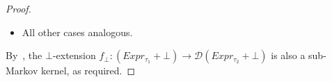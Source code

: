 \begin{proof}
\begin{itemize}
		\medskip
		Then:
		\begin{align*}
			R_s &= \{\vec{r} \in A_{s;\tau_1} \mid \letkw\; y = s[\vec{r}]\; \inkw\; e_2 \in A\} \\
			&= \{\vec{r} \in A_{s;\tau_1} \mid s'[(\vec{r},\vec{c})] \in A\} \\
			&= \{\vec{r} \in A_{s;\tau_1} \mid s'[\phi_{\vec{c}}(\vec{r})] \in A\} \\
			&= \{\vec{r} \in A_{s;\tau_1} \mid \phi_{\vec{c}}(\vec{r}) \in A_{s'}\} \\
			&= \phi_{\vec{c}}^{-1}(A_{s'}).
		\end{align*}
		Since $A_{s'} \in \mathcal{F}_{s';\tau_2}$ and $\phi_{\vec{c}}$ is measurable, we conclude
		\[
			\phi_{\vec{c}}^{-1}(A_{s'}) \in \mathcal{F}_{s;\tau_1},
		\]
		and therefore $B \cap Expr_{s;\tau_1} \in \mathcal{F}_{Expr_{s;\tau_1}}$ for all $s \in \skel_{\tau_1}$, giving $B \in \mathcal{F}_{Expr_{\tau_1}}$ as required.

		\medskip

		Hence, $\{x \in Expr_{\tau_1} \mid g(x) > a\} \in \mathcal{F}_{Expr_{\tau_1}}$ for all $a \in \R$, so $g^{-1}((a,\infty) \cap [0,1]) \in \mathcal{F}_{Expr_{\tau_1}}$ for all $a \in \R$. Hence $g^{-1}(B) \in \mathcal{F}_{Expr_{\tau_1}}$ for every $B \in \mathcal{B}([0,1])$, and $g$ is measurable.

		\medskip

		Thus, $f \colon Expr_{\tau_1} \to \mathcal{D}(Expr_{\tau_2} + \bot)$ is a sub-Markov kernel.

		\item All other cases analogous. 
	\end{itemize}
	By~, the $\bot$-extension $f_\bot \colon (Expr_{\tau_1} + \bot) \to \mathcal{D}(Expr_{\tau_2} + \bot)$ is also a sub-Markov kernel, as required.
\end{proof}

